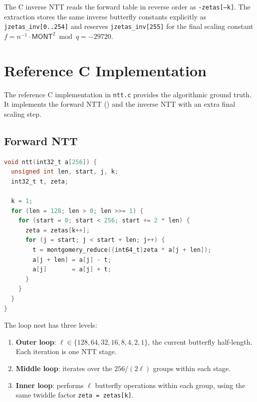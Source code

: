 The C inverse NTT reads the forward table in reverse order as
\texttt{-zetas[--k]}.  The \jasmin{} extraction stores the same inverse
butterfly constants explicitly as \texttt{jzetas\_inv[0..254]} and reserves
\texttt{jzetas\_inv[255]} for the final scaling constant
$f = n^{-1} \cdot \mathsf{MONT}^2 \bmod q = -29720$.

\section{Reference C Implementation}
\label{sec:c_impl}

The reference C implementation in \texttt{ntt.c} provides the algorithmic
ground truth.  It implements the forward NTT () and the inverse
NTT with an extra final scaling step.

\subsection{Forward NTT}

\begin{lstlisting}[language=C,
  caption={Forward NTT from \texttt{ntt.c}},
  label={lst:c_ntt}]
void ntt(int32_t a[256]) {
  unsigned int len, start, j, k;
  int32_t t, zeta;

  k = 1;
  for (len = 128; len > 0; len >>= 1) {
    for (start = 0; start < 256; start += 2 * len) {
      zeta = zetas[k++];
      for (j = start; j < start + len; j++) {
        t = montgomery_reduce((int64_t)zeta * a[j + len]);
        a[j + len] = a[j] - t;
        a[j]       = a[j] + t;
      }
    }
  }
}
\end{lstlisting}

The loop nest has three levels:
\begin{enumerate}
  \item \textbf{Outer loop}: $\ell \in \{128, 64, 32, 16, 8, 4, 2, 1\}$,
        the current butterfly half-length.  Each iteration is one NTT stage.
  \item \textbf{Middle loop}: iterates over the $256 / (2\ell)$ groups within
        each stage.
  \item \textbf{Inner loop}: performs $\ell$ butterfly operations within each
        group, using the same twiddle factor \texttt{zeta = zetas[k]}.
\end{enumerate}

